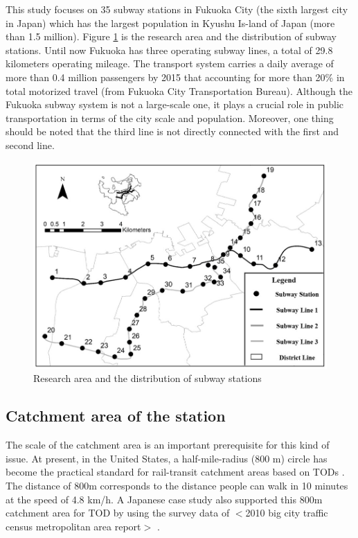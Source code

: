 \documentclass[utf8]{article}
\begin{document}
%
This study focuses on 35 subway stations in Fukuoka City (the sixth largest city in Japan) which has the largest population in Kyushu Is-land of Japan (more than 1.5 million). Figure \ref{fig:ResearchArea} is the research area and the distribution of subway stations. Until now Fukuoka has three operating subway lines, a total of 29.8 kilometers operating mileage. The transport system carries a daily average of more than 0.4 million passengers by 2015 that accounting for more than 20\% in total motorized travel (from Fukuoka City Transportation Bureau). Although the Fukuoka subway system is not a large-scale one, it plays a crucial role in public transportation in terms of the city scale and population. Moreover, one thing should be noted that the third line is not directly connected with the first and second line.

\begin{figure}[htbp]
	\centering
	\includegraphics[width=\linewidth]{ResearchArea}
	\caption{Research area and the distribution of subway stations}
	\label{fig:ResearchArea}
\end{figure}

%
\subsection{Catchment area of the station}
\indent

The scale of the catchment area is an important prerequisite for this kind of issue. At present, in the United States, a half-mile-radius (800 m) circle has become the practical standard for rail-transit catchment areas based on TODs \cite{Guerra2013}. The distance of 800m corresponds to the distance people can walk in 10 minutes at the speed of 4.8 km/h. A Japanese case study also supported this 800m catchment area for TOD by using the survey data of $<$2010 big city traffic census metropolitan area report$>$ \cite{TadakatsuNakamura2015}.
\end{document}
